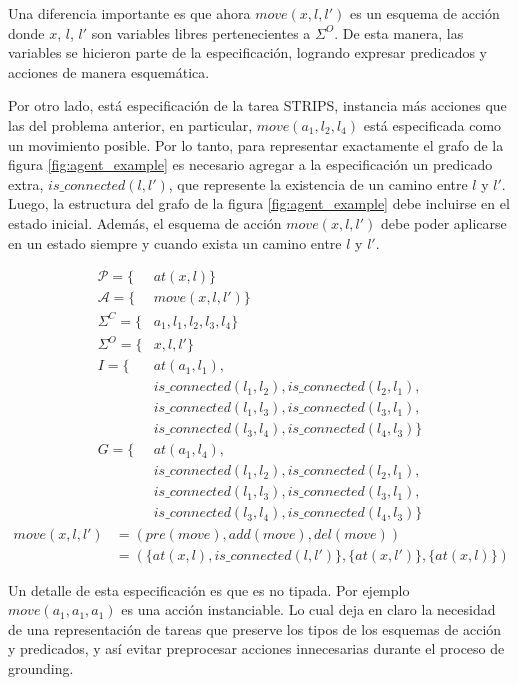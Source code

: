 Una diferencia importante es que ahora $move(x, l, l')$ es un esquema de acción
donde $x$, $l$, $l'$ son variables libres pertenecientes a $\Sigma^{O}$. De esta
manera, las variables se hicieron parte de la especificación, logrando expresar
predicados y acciones de manera esquemática.

Por otro lado, está especificación de la tarea STRIPS, instancia más acciones
que las del problema anterior, en particular, $move(a_1, l_2, l_4)$ está
especificada como un movimiento posible. Por lo tanto, para representar
exactamente el grafo de la figura \ref{fig:agent_example} es necesario agregar a
la especificación un predicado extra, $is\_connected(l, l')$, que represente la
existencia de un camino entre $l$ y $l'$. Luego, la estructura del grafo de la
figura \ref{fig:agent_example} debe incluirse en el estado inicial. Además, el
esquema de acción $move(x, l, l')$ debe poder aplicarse en un estado siempre y
cuando exista un camino entre $l$ y $l'$.

\begin{align*}
    \mathcal{P} = \{&at(x, l)\} \\
    \mathcal{A} = \{&move(x, l, l')\} \\
    \Sigma^{C} = \{&a_1, l_1, l_2, l_3, l_4\} \\
    \Sigma^{O} = \{&x, l, l'\} \\
    I = \{& at(a_1, l_1), \\
          & is\_connected(l_1, l_2), is\_connected(l_2, l_1), \\
          & is\_connected(l_1, l_3), is\_connected(l_3, l_1), \\
          & is\_connected(l_3, l_4), is\_connected(l_4, l_3)\} \\
    G = \{& at(a_1, l_4), \\
          & is\_connected(l_1, l_2), is\_connected(l_2, l_1), \\
          & is\_connected(l_1, l_3), is\_connected(l_3, l_1), \\
          & is\_connected(l_3, l_4), is\_connected(l_4, l_3)\}
\end{align*}
\begin{align*}
    move(x, l, l') &= (pre(move), add(move), del(move)) \\
                   &= (\{at(x, l), is\_connected(l, l')\}, \{at(x, l')\},\{at(x, l)\})
\end{align*}

Un detalle de esta especificación es que es no tipada. Por ejemplo $move(a_1,
a_1, a_1)$ es una acción instanciable. Lo cual deja en claro la necesidad de una
representación de tareas que preserve los tipos de los esquemas de acción y
predicados, y así evitar preprocesar acciones innecesarias durante el proceso de
grounding.

